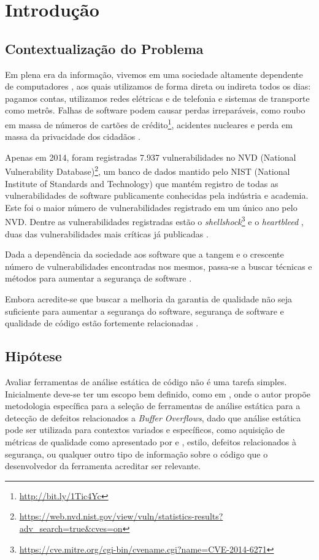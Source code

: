 \chapter{Introdução} \label{introducao}

\section{Contextualização do Problema}

Em plena era da informação, vivemos em uma sociedade altamente dependente de computadores \cite{inclusao}, aos quais utilizamos de forma direta ou indireta todos os dias: pagamos contas, utilizamos redes elétricas e de telefonia e sistemas de transporte como metrôs.  Falhas de software podem causar perdas irreparáveis, como roubo em massa de números de cartões de crédito\footnote{\url{http://bit.ly/1Tic4Yc}}, acidentes nucleares \cite{stuxnet} e perda em massa da privacidade dos cidadãos \cite{snowden}.

Apenas em 2014, foram registradas 7.937 vulnerabilidades no NVD (National Vulnerability Database)\footnote{\url{https://web.nvd.nist.gov/view/vuln/statistics-results?adv_search=true&cves=on}}, um banco de dados mantido pelo NIST (National Institute of Standards and Technology) que mantém registro de todas as vulnerabilidades de software publicamente conhecidas pela indústria e academia. Este foi o maior número de vulnerabilidades registrado em um único ano pelo NVD. Dentre as vulnerabilidades registradas estão o \textit{shellshock}\footnote{\url{https://cve.mitre.org/cgi-bin/cvename.cgi?name=CVE-2014-6271}} e o \textit{heartbleed} \cite{heartbleed}, duas das vulnerabilidades mais críticas já publicadas \cite{heartbleed}.

Dada a dependência da sociedade aos software que a tangem e o crescente número de vulnerabilidades encontradas nos mesmos, passa-se a buscar técnicas e métodos para aumentar a segurança de software \cite{sociedade}.

Embora acredite-se que buscar a melhoria da garantia de qualidade não seja suficiente para aumentar a segurança do software, segurança de software e qualidade de código estão fortemente relacionadas \cite{secure_programming}.

\section{Hipótese}

Avaliar ferramentas de análise estática de código não é uma tarefa simples.
Inicialmente deve-se ter um escopo bem definido, como em \cite{harvard}, onde o autor propõe metodologia específica para a seleção de ferramentas de análise estática para a detecção de defeitos relacionados a \textit{Buffer Overflows}, dado que análise estática pode ser utilizada para contextos variados e específicos, como aquisição de métricas de qualidade como apresentado por \cite{meirelles2013} e \cite{analizoartigo}, estilo, defeitos relacionados à segurança, ou qualquer outro tipo de informação sobre o código que o desenvolvedor da ferramenta acreditar ser relevante.

